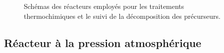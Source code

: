 \begin{figure}[!b]
  \hfill

  \caption{\label{fig:experimental_system}Schémas des réacteurs employés pour les traitements thermochimiques et le suivi de la décomposition des précurseurs.}
\end{figure}

\subsection{Réacteur à la pression atmosphérique}
\label{sec:reacteur_pa}

